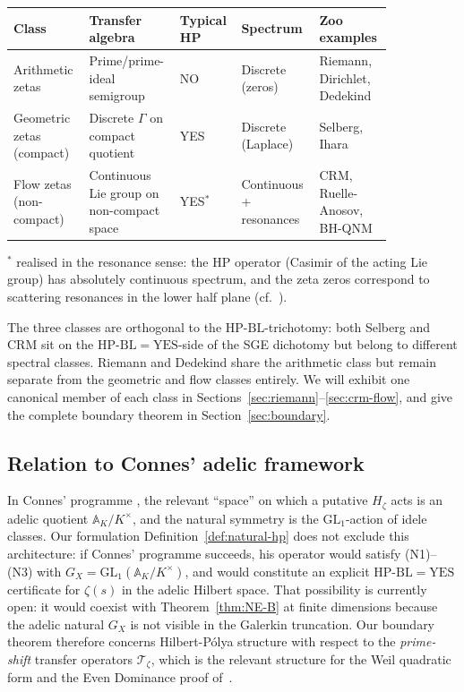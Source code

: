 \documentclass[11pt]{article}
\theoremstyle{definition}
\theoremstyle{remark}
\newcommand{\HBL}{\mathrm{HP\text{-}BL}}
\begin{document}
\begin{center}
\small
\setlength{\tabcolsep}{3pt}
\renewcommand{\arraystretch}{1.18}
\begin{tabular}{@{}p{0.19\linewidth} p{0.18\linewidth} p{0.12\linewidth} p{0.18\linewidth} p{0.17\linewidth}@{}}
\toprule
\textbf{Class} & \textbf{Transfer algebra} & \textbf{Typical HP} & \textbf{Spectrum} & \textbf{Zoo examples} \\
\midrule
Arithmetic zetas & Prime/prime-ideal semigroup & NO & Discrete (zeros) & Riemann, Dirichlet, Dedekind \\
Geometric zetas (compact) & Discrete $\Gamma$ on compact quotient & YES & Discrete (Laplace) & Selberg, Ihara \\
Flow zetas (non-compact) & Continuous Lie group on non-compact space & YES${}^*$ & Continuous + resonances & CRM, Ruelle-Anosov, BH-QNM \\
\bottomrule
\end{tabular}
\end{center}
${}^*$ realised in the resonance sense: the HP operator (Casimir of
the acting Lie group) has absolutely continuous spectrum, and the
zeta zeros correspond to scattering resonances in the lower half
plane (cf.~\cite{DyatlovZworski2019}).

The three classes are orthogonal to the $\HBL$-trichotomy: both
Selberg and CRM sit on the $\HBL = \mathrm{YES}$-side of the SGE
dichotomy but belong to different spectral classes. Riemann and
Dedekind share the arithmetic class but remain separate from the
geometric and flow classes entirely. We will exhibit one canonical
member of each class in
Sections~\ref{sec:riemann}--\ref{sec:crm-flow}, and give the
complete boundary theorem in Section~\ref{sec:boundary}.

\subsection{Relation to Connes' adelic framework}

In Connes' programme \cite{Connes1999, Connes2026}, the relevant
``space'' on which a putative $H_\zeta$ acts is an adelic quotient
$\mathbb{A}_K / K^\times$, and the natural symmetry is the
$\mathrm{GL}_1$-action of idele classes. Our formulation
Definition~\ref{def:natural-hp} does not exclude this architecture:
if Connes' programme succeeds, his operator would satisfy (N1)--(N3)
with $G_X = \mathrm{GL}_1(\mathbb{A}_K/K^\times)$, and would
constitute an explicit $\HBL = \mathrm{YES}$ certificate for
$\zeta(s)$ in the adelic Hilbert space. That possibility is currently
open: it would coexist with Theorem~\ref{thm:NE-B} at finite
dimensions because the adelic natural $G_X$ is not visible in the
Galerkin truncation. Our boundary theorem therefore concerns
Hilbert-P\'olya structure with respect to the \emph{prime-shift}
transfer operators $\mathcal{T}_\zeta$, which is the relevant
structure for the Weil quadratic form and the Even Dominance proof
of~\cite{Geiger2026RHII}.
\end{document}
